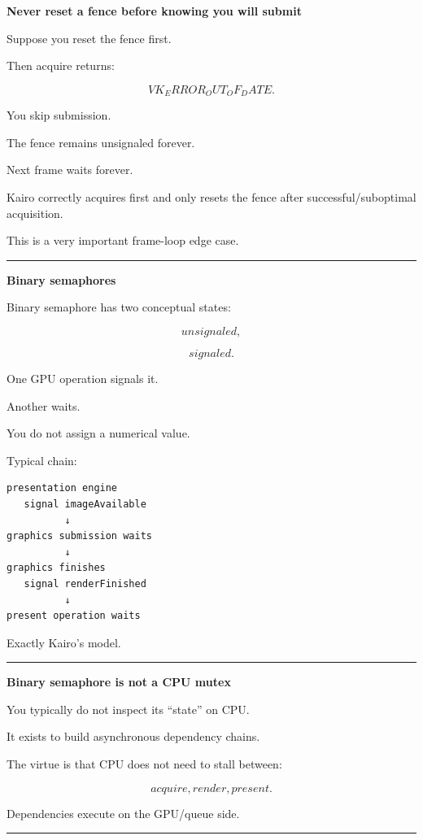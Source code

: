 \textbf{Never reset a fence before knowing you will submit}

Suppose you reset the fence first.

Then acquire returns:

\[
VK_ERROR_OUT_OF_DATE.
\]

You skip submission.

The fence remains unsignaled forever.

Next frame waits forever.

Kairo correctly acquires first and only resets the fence after successful/suboptimal acquisition.

This is a very important frame-loop edge case.

\begin{center}\rule{0.5\linewidth}{0.5pt}\end{center}

\textbf{Binary semaphores}

Binary semaphore has two conceptual states:

\[
unsignaled,
\]

\[
signaled.
\]

One GPU operation signals it.

Another waits.

You do not assign a numerical value.

Typical chain:

\begin{verbatim}
presentation engine
   signal imageAvailable
          ↓
graphics submission waits
          ↓
graphics finishes
   signal renderFinished
          ↓
present operation waits
\end{verbatim}

Exactly Kairo's model.

\begin{center}\rule{0.5\linewidth}{0.5pt}\end{center}

\textbf{Binary semaphore is not a CPU mutex}

You typically do not inspect its ``state'' on CPU.

It exists to build asynchronous dependency chains.

The virtue is that CPU does not need to stall between:

\[
acquire,
render,
present.
\]

Dependencies execute on the GPU/queue side.

\begin{center}\rule{0.5\linewidth}{0.5pt}\end{center}

